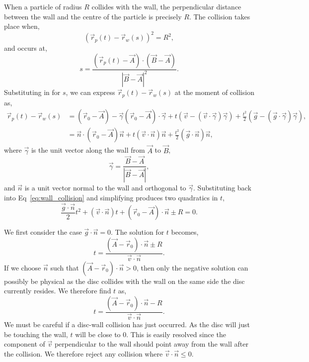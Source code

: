 \documentclass{article}
\begin{document}
When a particle of radius $R$ collides with the wall, the perpendicular distance between the wall and the centre of the particle is precisely $R$. The collision takes place when,
\begin{equation}
\label{eq:wall_collision}
    (\vec{r}_p(t) - \vec{r}_w(s))^2 = R^2,
\end{equation}
and occurs at,
\begin{equation}
    s
    =
    \frac{(\vec{r}_p(t) - \vec{A}) \cdot (\vec{B} - \vec{A})}{|\vec{B} - \vec{A}|^2}.
\end{equation}
Substituting in for $s$, we can express $\vec{r}_p(t) - \vec{r}_w(s)$ at the moment of collision as,
\begin{align}
    \vec{r}_p(t) - \vec{r}_w(s)
    &=
    \left(
        \vec{r}_0 - \vec{A}
    \right)
    -
    \vec{\gamma}
    \left(
        \vec{r}_0 - \vec{A}
    \right) \cdot \vec{\gamma}
    +
    t 
    \left(
        \vec{v}
        -
        (\vec{v} \cdot \vec{\gamma}) \vec{\gamma}
    \right)
    +
    \frac{t^2}{2} 
    \left(
        \vec{g}
        -
        (\vec{g} \cdot \vec{\gamma}) \vec{\gamma}
    \right), \\
    &=
    \vec{n} \cdot
    \left(
        \vec{r}_0 - \vec{A}
    \right) \vec{n}
    +
    t 
    (\vec{v} \cdot \vec{n}) \vec{n}
    +
    \frac{t^2}{2} 
    (\vec{g} \cdot \vec{n}) \vec{n},
\end{align}
where $\vec{\gamma}$ is the unit vector along the wall from $\vec{A}$ to $\vec{B}$,
\begin{equation}
    \vec{\gamma} = \frac{\vec{B} - \vec{A}}{|\vec{B}-\vec{A}|},
\end{equation}
and $\vec{n}$ is a unit vector normal to the wall and orthogonal to $\vec{\gamma}$. Substituting back into Eq~\ref{eq:wall_collision} and simplifying produces two quadratics in $t$,
\begin{equation}
    \frac{\vec{g} \cdot \vec{n}}{2} t^2
    +
    (\vec{v} \cdot \vec{n}) t
    +
    (\vec{r}_0 - \vec{A}) \cdot \vec{n}
    \pm R
    =
    0.
\end{equation}

We first consider the case $\vec{g} \cdot \vec{n} = 0$. The solution for $t$ becomes,
\begin{equation}
    t
    =
    \frac{(\vec{A} - \vec{r}_0) \cdot \vec{n} \pm R}{\vec{v} \cdot \vec{n}}.
\end{equation}
If we choose $\vec{n}$ such that $(\vec{A} - \vec{r}_0) \cdot \vec{n} > 0$, then only the negative solution can possibly be physical as the disc collides with the wall on the same side the disc currently resides. We therefore find $t$ as,
\begin{equation}
\label{eq:wall_collision_sol_g_zero}
    t
    =
    \frac{(\vec{A} - \vec{r}_0) \cdot \vec{n} - R}{\vec{v} \cdot \vec{n}}.
\end{equation}
We must be careful if a disc-wall collision has just occurred. As the disc will just be touching the wall, $t$ will be close to 0. This is easily resolved since the component of $\vec{v}$ perpendicular to the wall should point away from the wall after the collision. We therefore reject any collision where $\vec{v} \cdot \vec{n} \leq 0$.
\end{document}
